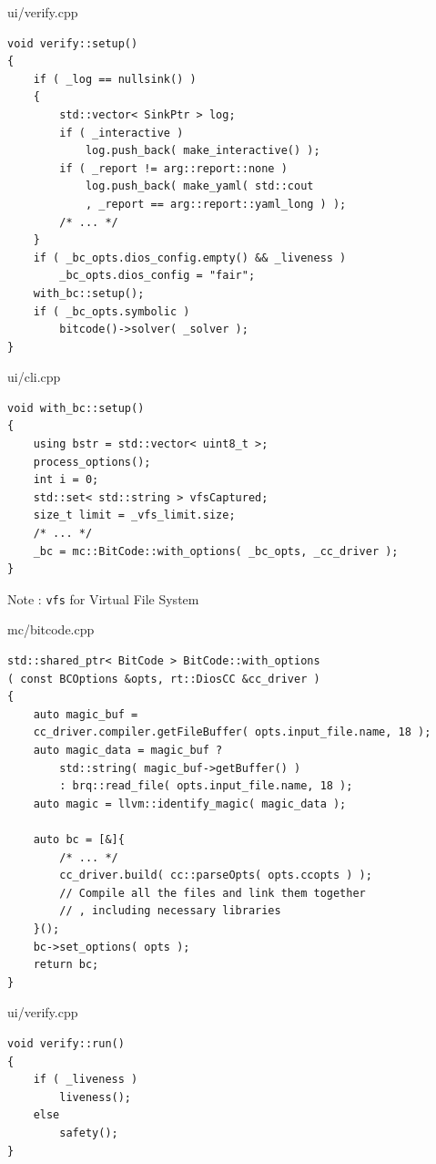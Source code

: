 \documentclass[12pt]{beamer}
\newcommand{\code}[1]{\texttt{#1}}
\begin{document}

\begin{frame}[fragile]{ui/verify.cpp}
\begin{lstlisting}[basicstyle=\footnotesize\ttfamily]
void verify::setup()
{
    if ( _log == nullsink() )
    {
        std::vector< SinkPtr > log;
        if ( _interactive )
            log.push_back( make_interactive() );
        if ( _report != arg::report::none )
            log.push_back( make_yaml( std::cout
            , _report == arg::report::yaml_long ) );
        /* ... */
    }
    if ( _bc_opts.dios_config.empty() && _liveness )
        _bc_opts.dios_config = "fair";
    with_bc::setup();
    if ( _bc_opts.symbolic )
        bitcode()->solver( _solver );
}
\end{lstlisting}
\end{frame}

\begin{frame}[fragile]{ui/cli.cpp}
\begin{lstlisting}[basicstyle=\footnotesize\ttfamily]
void with_bc::setup()
{
    using bstr = std::vector< uint8_t >;
    process_options();
    int i = 0;
    std::set< std::string > vfsCaptured;
    size_t limit = _vfs_limit.size;
    /* ... */
    _bc = mc::BitCode::with_options( _bc_opts, _cc_driver );
}
\end{lstlisting}
Note : \code{vfs} for Virtual File System
\end{frame}

\begin{frame}[fragile]{mc/bitcode.cpp}
\begin{lstlisting}[basicstyle=\footnotesize\ttfamily]
std::shared_ptr< BitCode > BitCode::with_options
( const BCOptions &opts, rt::DiosCC &cc_driver )
{
    auto magic_buf = 
    cc_driver.compiler.getFileBuffer( opts.input_file.name, 18 );
    auto magic_data = magic_buf ?
        std::string( magic_buf->getBuffer() )
        : brq::read_file( opts.input_file.name, 18 );
    auto magic = llvm::identify_magic( magic_data );
    
    auto bc = [&]{
        /* ... */
        cc_driver.build( cc::parseOpts( opts.ccopts ) );
        // Compile all the files and link them together
        // , including necessary libraries
    }();
    bc->set_options( opts );
    return bc;
}
\end{lstlisting}
\end{frame}


\begin{frame}[fragile]{ui/verify.cpp}
\begin{lstlisting}[basicstyle=\normalsize\ttfamily]
void verify::run()
{
    if ( _liveness )
        liveness();
    else
        safety();
}
\end{lstlisting}
\end{frame}
\end{document}
